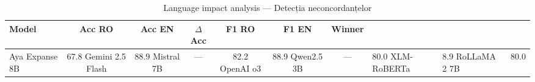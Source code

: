 \begin{table}[H]
\centering
\footnotesize
\caption{Language impact analysis — Detecția neconcordanțelor}
\label{tab:lang-impact-incongruity-detection}
\begin{tabular}{lcccccc}
\toprule
\textbf{Model} & \textbf{Acc RO} & \textbf{Acc EN} & \textbf{$\Delta$Acc} & \textbf{F1 RO} & \textbf{F1 EN} & \textbf{Winner} \\
\midrule
Aya Expanse 8B & 67.8%
Gemini 2.5 Flash & 88.9%
Mistral 7B & — & 82.2%
OpenAI o3 & 88.9%
Qwen2.5 3B & — & 80.0%
XLM-RoBERTa & 8.9%
RoLLaMA 2 7B & 80.0%
\bottomrule
\end{tabular}
\end{table}